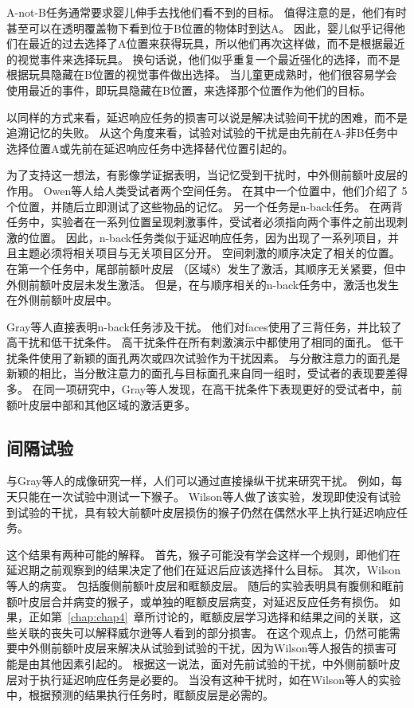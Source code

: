 A-not-B任务通常要求婴儿伸手去找他们看不到的目标。
值得注意的是，他们有时甚至可以在透明覆盖物下看到位于B位置的物体时到达A\cite{butterworth1977object}。
因此，婴儿似乎记得他们在最近的过去选择了A位置来获得玩具，所以他们再次这样做，而不是根据最近的视觉事件来选择玩具。
换句话说，他们似乎重复一个最近强化的选择，而不是根据玩具隐藏在B位置的视觉事件做出选择。
当儿童更成熟时，他们很容易学会使用最近的事件，即玩具隐藏在B位置，来选择那个位置作为他们的目标。


以同样的方式来看，延迟响应任务的损害可以说是解决试验间干扰的困难，而不是追溯记忆的失败。
从这个角度来看，试验对试验的干扰是由先前在A-非B任务中选择位置A或先前在延迟响应任务中选择替代位置引起的。


为了支持这一想法，有影像学证据表明，当记忆受到干扰时，中外侧前额叶皮层的作用。
Owen等人\cite{owen1999redefining}给人类受试者两个空间任务。
在其中一个位置中，他们介绍了 5 个位置，并随后立即测试了这些物品的记忆。
另一个任务是n-back任务。
在两背任务中，实验者在一系列位置呈现刺激事件，受试者必须指向两个事件之前出现刺激的位置。
因此，n-back任务类似于延迟响应任务，因为出现了一系列项目，并且主题必须将相关项目与无关项目区分开。
空间刺激的顺序决定了相关的位置。
在第一个任务中，尾部前额叶皮层 （区域8）发生了激活，其顺序无关紧要，但中外侧前额叶皮层未发生激活。
但是，在与顺序相关的n-back任务中，激活也发生在外侧前额叶皮层中。


Gray等人\cite{gray2003neural}直接表明n-back任务涉及干扰。
他们对faces使用了三背任务，并比较了高干扰和低干扰条件。
高干扰条件在所有刺激演示中都使用了相同的面孔。
低干扰条件使用了新颖的面孔两次或四次试验作为干扰因素。
与分散注意力的面孔是新颖的相比，当分散注意力的面孔与目标面孔来自同一组时，受试者的表现要差得多。
在同一项研究中，Gray等人发现，在高干扰条件下表现更好的受试者中，前额叶皮层中部和其他区域的激活更多。



\subsection{间隔试验}

与Gray等人\cite{gray2003neural}的成像研究一样，人们可以通过直接操纵干扰来研究干扰。
例如，每天只能在一次试验中测试一下猴子。
Wilson等人\cite{wilson1963effect}做了该实验，发现即使没有试验到试验的干扰，具有较大前额叶皮层损伤的猴子仍然在偶然水平上执行延迟响应任务。


这个结果有两种可能的解释。
首先，猴子可能没有学会这样一个规则，即他们在延迟期之前观察到的结果决定了他们在延迟后应该选择什么目标。
其次，Wilson等人的病变。
包括腹侧前额叶皮层和眶额皮层。
随后的实验表明具有腹侧和眶前额叶皮层合并病变的猴子\cite{passingham1971behavioural}，或单独的眶额皮层病变\cite{meunier1997effects}，对延迟反应任务有损伤。
如果，正如第~\ref{chap:chap4}~章所讨论的，眶额皮层学习选择和结果之间的关联，这些关联的丧失可以解释威尔逊等人看到的部分损害。
在这个观点上，仍然可能需要中外侧前额叶皮层来解决从试验到试验的干扰，因为Wilson等人报告的损害可能是由其他因素引起的。
根据这一说法，面对先前试验的干扰，中外侧前额叶皮层对于执行延迟响应任务是必要的。
当没有这种干扰时，如在Wilson等人的实验中，根据预测的结果执行任务时，眶额皮层是必需的。



